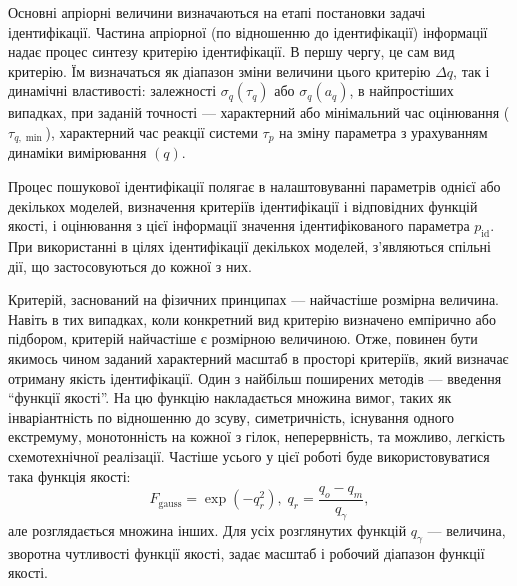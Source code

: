 \documentclass[a4paper,13pt]{atuaref}
\begin{document}

Основні апріорні величини визначаються на етапі постановки задачі
ідентифікації.
Частина апріорної (по відношенню до ідентифікації) інформації
надає процес синтезу критерію ідентифікації. В першу чергу, це сам вид
критерію. Їм визначаться як діапазон зміни величини цього критерію
$\Delta q$, так і динамічні властивості: залежності
$\sigma_q (\tau_q)$ або $\sigma_q(a_q)$,
в найпростіших випадках, при заданій точності --- характерний або
мінімальний час оцінювання ($\tau_{q, \min}$),
характерний час реакції
системи $\tau_p$ на зміну параметра з урахуванням динаміки вимірювання $(q)$.

Процес пошукової ідентифікації полягає в налаштовуванні параметрів однієї або
декількох моделей, визначення критеріїв ідентифікації і відповідних функцій
якості, і оцінювання з цієї інформації значення ідентифікованого параметра
$p_\mathrm{id}$. При використанні в цілях
ідентифікації декількох моделей, з'являються спільні дії, що застосовуються до
кожної з них.

Критерій, заснований на фізичних принципах --- найчастіше розмірна величина.
Навіть в тих випадках, коли конкретний вид критерію визначено емпірично або
підбором, критерій найчастіше є розмірною величиною.
Отже,
повинен бути якимось чином заданий характерний масштаб в просторі критеріїв,
який визначає отриману якість ідентифікації.
Один з найбільш поширених методів --- введення ``функції якості''.
На цю функцію накладається множина вимог, таких як
інваріантність по відношенню до зсуву, симетричність,
існування одного екстремуму, монотонність на кожної з гілок,
неперервність, та можливо, легкість схемотехнічної реалізації.
Частіше усього у цієї роботі буде використовуватися така функція якості:
\begin{equation}
  F_{\mathrm{gauss}} = \exp( - q_r^2 ),
  \;
  q_r = \frac{q_o - q_m}{q_\gamma},
\label{atu:eq:F_gauss}
\end{equation}
%
але розглядається множина інших.
Для усіх розглянутих функцій $q_\gamma$ --- величина,
зворотна чутливості функції якості, задає масштаб і робочий діапазон функції якості.

\end{document}
